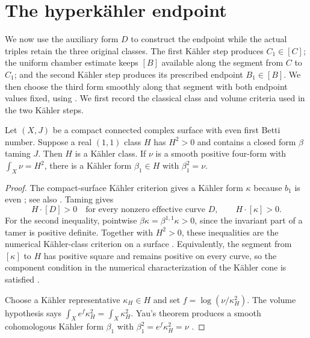 \section{The hyperk\"ahler endpoint}\label{sec:endpoint}

We now use the auxiliary form $D$ to construct the endpoint while the
actual triples retain the three original classes.  The first K\"ahler
step produces $C_1\in[C]$; the uniform chamber estimate keeps $[B]$
available along the segment from $C$ to $C_1$; and the second K\"ahler
step produces its prescribed endpoint $B_1\in[B]$.  We then choose
the third form smoothly along that segment with both endpoint values
fixed, using .  We first record the classical
class and volume criteria used in the two K\"ahler steps.

\begin{lemma}\label{lem:endpoint-kahler-class}
Let $(X,J)$ be a compact connected complex surface with even first
Betti number. Suppose a real $(1,1)$ class $H$ has $H^2>0$ and contains
a closed form $\beta$ taming $J$. Then $H$ is a K\"ahler class.
If $\nu$ is a smooth positive four-form with $\int_X\nu=H^2$, there is
a K\"ahler form $\beta_1\in H$ with $\beta_1^2=\nu$.
\end{lemma}

\begin{proof}
The compact-surface K\"ahler criterion gives a K\"ahler form $\kappa$
because $b_1$ is even \cite[Theorem~11]{Buchdahl1999}; see also
\cite[Corollaire~5.7]{Lamari1999}. Taming gives
\[
 H\cdot[D]>0
 \quad\text{for every nonzero effective curve }D,
 \qquad H\cdot[\kappa]>0.
\]
For the second inequality, pointwise
$\beta\kappa=\beta^{1,1}\kappa>0$, since the invariant part of a tamer
is positive definite. Together with $H^2>0$, these inequalities are
the numerical K\"ahler-class criterion on a surface
\cite[Corollary~15]{Buchdahl1999}. Equivalently, the segment from
$[\kappa]$ to $H$ has positive square and remains positive on every
curve, so the component condition in the numerical characterization
of the K\"ahler cone is satisfied
\cite[Theorem~0.1]{DemaillyPaun2004}.

Choose a K\"ahler representative $\kappa_H\in H$ and set
$f=\log(\nu/\kappa_H^2)$. The volume hypothesis says
$\int_X e^f\kappa_H^2=\int_X\kappa_H^2$. Yau's theorem produces a
smooth cohomologous K\"ahler form $\beta_1$ with
$\beta_1^2=e^f\kappa_H^2=\nu$
\cite[Section~4, Theorem~1]{Yau1978}.
\end{proof}

